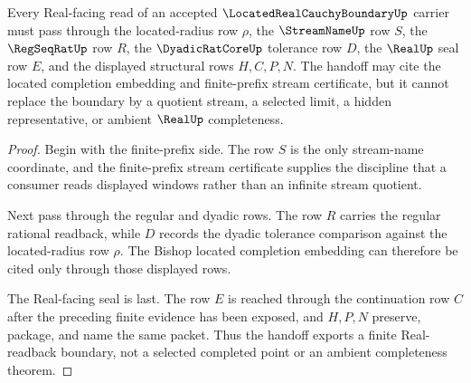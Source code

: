 \begin{theorem}
\label{thm:located-real-cauchy-boundary-real-handoff}
Every Real-facing read of an accepted $\LocatedRealCauchyBoundaryUp$ carrier must pass through the located-radius row $\rho$, the $\StreamNameUp$ row $S$, the $\RegSeqRatUp$ row $R$, the $\DyadicRatCoreUp$ tolerance row $D$, the $\RealUp$ seal row $E$, and the displayed structural rows $H,C,P,N$. The handoff may cite the located completion embedding and finite-prefix stream certificate, but it cannot replace the boundary by a quotient stream, a selected limit, a hidden representative, or ambient $\RealUp$ completeness.
\end{theorem}
\begin{proof}
Begin with the finite-prefix side. The row $S$ is the only stream-name coordinate, and the finite-prefix stream certificate supplies the discipline that a consumer reads displayed windows rather than an infinite stream quotient.

Next pass through the regular and dyadic rows. The row $R$ carries the regular rational readback, while $D$ records the dyadic tolerance comparison against the located-radius row $\rho$. The Bishop located completion embedding can therefore be cited only through those displayed rows.

The Real-facing seal is last. The row $E$ is reached through the continuation row $C$ after the preceding finite evidence has been exposed, and $H,P,N$ preserve, package, and name the same packet. Thus the handoff exports a finite Real-readback boundary, not a selected completed point or an ambient completeness theorem.
\end{proof}


\begin{closurestatus}{\LocatedRealCauchyBoundaryUp}
  \theoryclosure{\seedClosure}
  \formalstatus{\unformalizedV}
\end{closurestatus}
